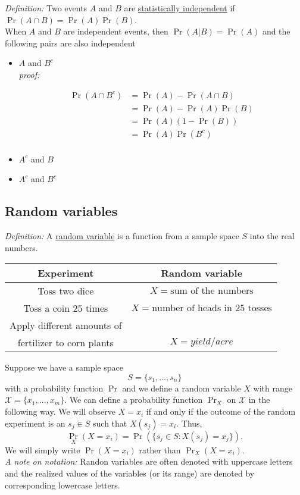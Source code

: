 {\it Definition: }Two events $A$ and $B$ are \underline{statistically independent} if $\Pr(A \cap B) = \Pr(A) \Pr(B)$.\\
When $A$ and $B$ are independent events, then $\Pr(A|B) = \Pr(A)$ and the following pairs are also independent
\begin{itemize}
  \item $A$ and $B^c$\\
  {\it proof: }
  \begin{pf}
  $$
  \begin{aligned}
  \Pr(A\cap B^c) &= \Pr(A) - \Pr(A \cap B)\\
  &= \Pr(A) - \Pr(A)\Pr(B)\\
  &= \Pr(A)(1 - \Pr(B))\\
  &= \Pr(A)\Pr(B^c)\\
  \end{aligned}
  $$
  \end{pf}
  \item $A^c$ and $B$
  \item $A^c$ and $B^c$
\end{itemize}

\subsection*{Random variables}
{\it Definition: } A \underline{random variable} is a function from a sample space $S$ into the real numbers.

\begin{center}
\begin{tabular}{  c c}
\hline
Experiment & Random variable\\
\hline
Toss two dice & $X = \mbox{sum of the numbers}$\\
Toss a coin $25$ times & $X = \mbox{number of heads in 25 tosses}$\\
Apply different amounts of\\ fertilizer to corn plants & $X = yield/acre$\\
\hline
\end{tabular}
\end{center}

Suppose we have a sample space
$$
S = \{ s_1, \dots, s_n\}
$$
with a probability function $\Pr$ and we define a random variable $X$ with range $\mathcal{X} = \{x_1, \dots, x_m\}$.
We can define a probability function $\Pr_X$ on $\mathcal{X}$ in the following way.
We will observe $X=x_i$ if and only if the outcome of the random experiment is an $s_j \in S$ such that $X(s_j) = x_i$.
Thus,
$$
{\Pr}_X(X = x_i) = \Pr(\{ s_j \in S: X(s_j) = x_j \}).
$$
We will simply write $\Pr(X = x_i)$ rather than ${\Pr}_X(X=x_i)$.\\
{\it A note on notation:} Randon variables are often denoted with uppercase letters and the realized values of the variables (or its range) are denoted by corresponding lowercase letters.

